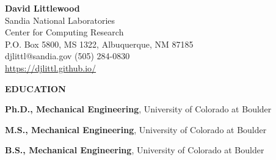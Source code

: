 \documentclass[11pt]{article}
\newlength{\itemskip} \setlength{\itemskip}{0.0in}
\newlength{\sectionskip} \setlength{\sectionskip}{0.2in}
\newlength{\listskip} \setlength{\listskip}{0.05in}
\newlength{\minipagewidth} \setlength{\minipagewidth}{6.25in} %
\begin{document}
\thispagestyle{empty}

\begin{center}
{\LARGE \textbf{David Littlewood}} \\
\vspace{0.1in}
%
Sandia National Laboratories \\
Center for Computing Research \\
P.O. Box 5800, MS 1322, Albuquerque, NM 87185 \\
djlittl@sandia.gov \hspace{.1in} (505) 284-0830 \\
\href{https://djlittl.github.io/}{https://djlittl.github.io/} \\
%
\end{center}

\noindent
{\large \textbf{EDUCATION}}
\vspace{\sectionskip}

\begin{minipage}{\minipagewidth}
\textbf{Ph.D., Mechanical Engineering}, University of Colorado at Boulder%
%
\end{minipage}\vspace{\itemskip}

\begin{minipage}{\minipagewidth}
\textbf{M.S., Mechanical Engineering}, University of Colorado at Boulder%
\end{minipage}\vspace{\itemskip}

\begin{minipage}{\minipagewidth}
\textbf{B.S., Mechanical Engineering}, University of Colorado at Boulder%
\end{minipage}
\end{document}
